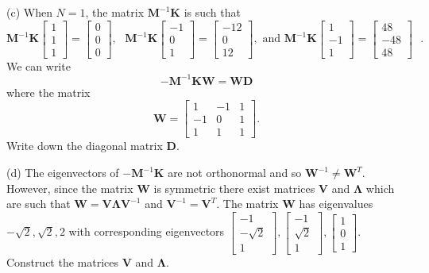 \documentclass[11pt,twoside,reqno,a4paper]{amsart}
\begin{document}
(c) When $N=1$, the matrix $\boldsymbol{M}^{-1}\boldsymbol{K}$ is such that
\[
\boldsymbol{M}^{-1}\boldsymbol{K}\left[\begin{array}{c}1 \\ 1 \\ 1\end{array}\right]=\left[\begin{array}{c}0 \\ 0 \\ 0\end{array}\right],\mbox{ }\boldsymbol{M}^{-1}\boldsymbol{K}\left[\begin{array}{c}-1 \\ 0 \\ 1\end{array}\right]=\left[\begin{array}{c}-12 \\ 0 \\ 12\end{array}\right],\mbox{ and }\boldsymbol{M}^{-1}\boldsymbol{K}\left[\begin{array}{c}1 \\ -1 \\ 1\end{array}\right]=\left[\begin{array}{c}48 \\ -48 \\ 48\end{array}\right]\mbox{ }.
\]
We can write
\[
-\boldsymbol{M}^{-1}\boldsymbol{K}\boldsymbol{W}=\boldsymbol{W}\boldsymbol{D}
\]
where the matrix
\[
\boldsymbol{W}=\left[\begin{array}{ccc}1 & -1 & 1 \\ -1 & 0 & 1 \\ 1 & 1 & 1\end{array}\right].
\]
Write down the diagonal matrix $\boldsymbol{D}$.

(d) The eigenvectors of $-\boldsymbol{M}^{-1}\boldsymbol{K}$ are not orthonormal and so $\boldsymbol{W}^{-1}\ne\boldsymbol{W}^T$. However, since the matrix $\boldsymbol{W}$ is symmetric there exist matrices $\boldsymbol{V}$ and $\boldsymbol{\Lambda}$ which are such that $\boldsymbol{W}=\boldsymbol{V}\boldsymbol{\Lambda}\boldsymbol{V}^{-1}$ and $\boldsymbol{V}^{-1}=\boldsymbol{V}^T$. The matrix $\boldsymbol{W}$ has eigenvalues $-\sqrt{2},\sqrt{2},2$ with corresponding eigenvectors $\left[\begin{array}{c} -1 \\ -\sqrt{2} \\ 1\end{array}\right],\left[\begin{array}{c} -1 \\ \sqrt{2} \\ 1\end{array}\right],\left[\begin{array}{c} 1 \\ 0 \\ 1\end{array}\right]$. Construct the matrices $\boldsymbol{V}$ and $\boldsymbol{\Lambda}$.
\end{document}
